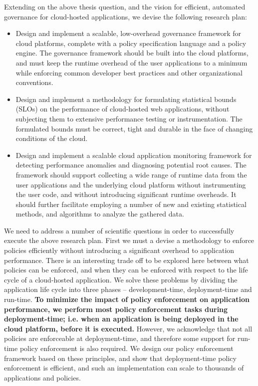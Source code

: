 Extending on the above thesis question, and the vision for efficient, automated governance for
cloud-hosted applications, we devise the following research plan:

\begin{itemize}
\item Design and implement a scalable, low-overhead governance framework for cloud platforms,
complete with a policy specification language and a policy engine. The governance framework should be
built into the cloud platforms, and must
keep the runtime overhead of the user applications to a minimum while enforcing
common developer best practices and other organizational conventions.
\item Design and implement a methodology for formulating statistical bounds (SLOs) on the
performance of cloud-hosted web applications, without
 subjecting them to extensive performance testing or instrumentation. The formulated
bounds must be correct, tight and durable in the face of changing
 conditions of the cloud.
 \item Design and implement a scalable cloud application monitoring framework for detecting
performance anomalies and diagnosing potential root causes. 
The framework should support collecting
 a wide range of runtime data from the user applications and the underlying cloud platform
 without instrumenting the user code, and without introducing significant runtime overheads.
 It should further facilitate employing a number of new and existing statistical methods,
 and algorithms to analyze the gathered data.
\end{itemize}

We need to address a number of scientific questions in order to successfully execute the 
above research plan. First we must a devise a methodology to enforce policies efficiently
without introducing a significant overhead to application performance. There is an interesting
trade off to be explored here between what policies can be enforced, and when they can be enforced with respect
to the life cycle of a cloud-hosted application. We solve these problems by dividing the application
life cycle into three phases -- development-time, deployment-time and run-time. \textbf{To minimize the
impact of policy enforcement on application performance, we perform most policy
enforcement tasks during deployment-time; i.e. when an application is being deployed in the 
cloud platform, before it is executed.} However, we acknowledge that not all policies
are enforceable at deployment-time, and therefore some support for run-time policy enforcement
is also required. We design our policy enforcement framework based on these principles, and 
show that deployment-time policy enforcement is efficient, and such an implementation can scale
to thousands of applications and policies.

